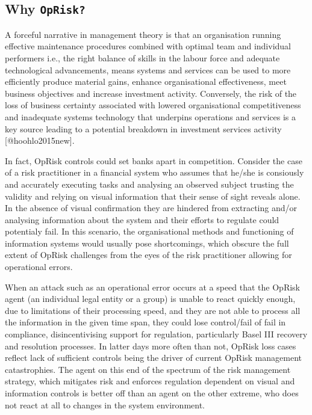 \documentclass[]{article}
\begin{document}
\subsection{Why \texttt{OpRisk?}}

A forceful narrative in management theory is that an organisation
running effective maintenance procedures combined with optimal team and
individual performers i.e., the right balance of skills in the labour
force and adequate technological advancements, means systems and
services can be used to more efficiently produce material gains, enhance
organisational effectiveness, meet business objectives and increase
investment activity. Conversely, the risk of the loss of business
certainty associated with lowered organisational competitiveness and
inadequate systems technology that underpins operations and services is
a key source leading to a potential breakdown in investment services
activity {[}@hoohlo2015new{]}.\medskip

In fact, OpRisk controls could set banks apart in competition. Consider
the case of a risk practitioner in a financial system who assumes that
he/she is consiously and accurately executing tasks and analysing an
observed subject trusting the validity and relying on visual information
that their sense of sight reveals alone. In the absence of visual
confirmation they are hindered from extracting and/or analysing
information about the system and their efforts to regulate could
potentialy fail. In this scenario, the organisational methods and
functioning of information systems would usually pose shortcomings,
which obscure the full extent of OpRisk challenges from the eyes of the
risk practitioner allowing for operational errors. \medskip

When an attack such as an operational error occurs at a speed that the
OpRisk agent (an individual legal entity or a group) is unable to react
quickly enough, due to limitations of their processing speed, and they
are not able to process all the information in the given time span, they
could lose control/fail of fail in compliance, disincentivising support
for regulation, particularly Basel III recovery and resolution
processes. In latter days more often than not, OpRisk loss cases reflect
lack of sufficient controls being the driver of current OpRisk
management catastrophies. The agent on this end of the spectrum of the
risk management strategy, which mitigates risk and enforces regulation
dependent on visual and information controls is better off than an agent
on the other extreme, who does not react at all to changes in the system
environment.
\end{document}
